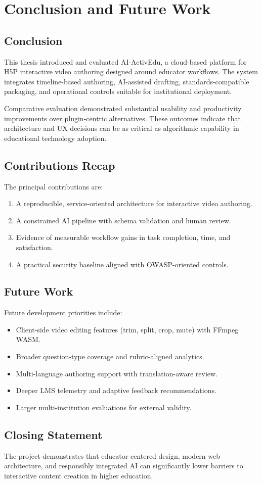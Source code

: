 \chapter{Conclusion and Future Work}

\section{Conclusion}
This thesis introduced and evaluated AI-ActivEdu, a cloud-based platform for H5P interactive video authoring designed around educator workflows. The system integrates timeline-based authoring, AI-assisted drafting, standards-compatible packaging, and operational controls suitable for institutional deployment.

Comparative evaluation demonstrated substantial usability and productivity improvements over plugin-centric alternatives. These outcomes indicate that architecture and UX decisions can be as critical as algorithmic capability in educational technology adoption.

\section{Contributions Recap}
The principal contributions are:
\begin{enumerate}[leftmargin=2em]
\item A reproducible, service-oriented architecture for interactive video authoring.
\item A constrained AI pipeline with schema validation and human review.
\item Evidence of measurable workflow gains in task completion, time, and satisfaction.
\item A practical security baseline aligned with OWASP-oriented controls.
\end{enumerate}

\section{Future Work}
Future development priorities include:
\begin{itemize}[leftmargin=2em]
\item Client-side video editing features (trim, split, crop, mute) with FFmpeg WASM.
\item Broader question-type coverage and rubric-aligned analytics.
\item Multi-language authoring support with translation-aware review.
\item Deeper LMS telemetry and adaptive feedback recommendations.
\item Larger multi-institution evaluations for external validity.
\end{itemize}

\section{Closing Statement}
The project demonstrates that educator-centered design, modern web architecture, and responsibly integrated AI can significantly lower barriers to interactive content creation in higher education.
